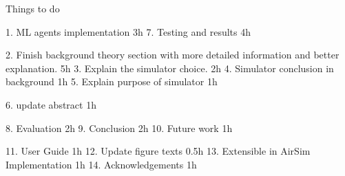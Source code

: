 

Things to do


1. ML agents implementation 3h
7. Testing and results 4h

2. Finish background theory section with more detailed information and better explanation. 5h
3. Explain the simulator choice. 2h
4. Simulator conclusion in background 1h
5. Explain purpose of simulator 1h

6. update abstract 1h

8. Evaluation 2h
9. Conclusion 2h 
10. Future work 1h

11. User Guide 1h
12. Update figure texts 0.5h
13. Extensible in AirSim Implementation 1h
14. Acknowledgements 1h
